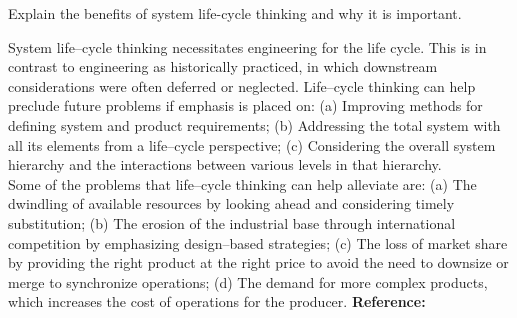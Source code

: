 \begin{exercises}
    \begin{exercise}
    \label{sea-02-10}
        Explain the benefits of system life-cycle thinking and why it is important.
    \end{exercise}
    \begin{solution}
        System life–cycle thinking necessitates engineering for the life cycle. This is in contrast to engineering as historically practiced, in which downstream considerations were often deferred or neglected. Life–cycle thinking can help preclude future problems if emphasis is placed on: (a) Improving methods for defining system and product requirements; (b) Addressing the total system with all its elements from a life–cycle perspective; (c) Considering the overall system hierarchy and the interactions between various levels in that hierarchy.\\
        Some of the problems that life–cycle thinking can help alleviate are: (a) The dwindling of available resources by looking ahead and considering timely substitution; (b) The erosion of the industrial base through international competition by emphasizing design–based strategies; (c) The loss of market share by providing the right product at the right price to avoid the need to downsize or merge to synchronize operations; (d) The demand for more complex products, which increases the cost of operations for the producer. \textbf{Reference:}
    \end{solution}
    

\end{exercises}
